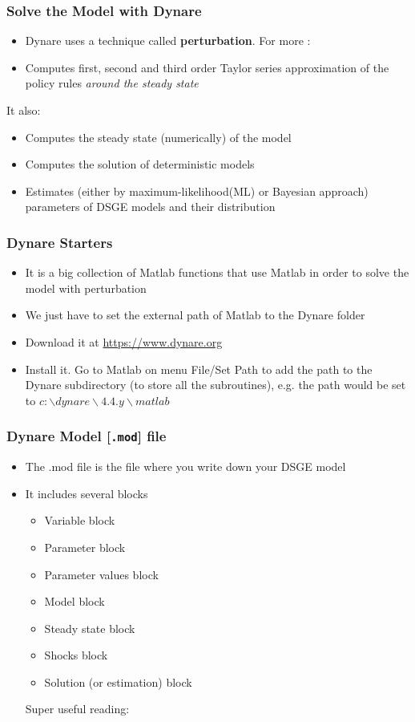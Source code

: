 \documentclass[xcolor=dvipsnames,handout,aspectratio=169]{beamer}
\let\oldcite=\cite
\renewcommand\cite[1]{\hypersetup{linkcolor=blue} \hyperlink{#1}{\oldcite{#1}}}
\begin{document}
\begin{frame}[t]\frametitle{\textbf{Solve the Model with Dynare}}
  \begin{itemize}
     \setlength\itemsep{2em}
  \item Dynare uses a technique called \textbf{perturbation}. For more : \cite{judd1998numerical}
  \item Computes first, second and third order Taylor series approximation of the policy rules \textit{around the steady state} 
  \end{itemize}
  It also: 
    \begin{itemize}
           \setlength\itemsep{2em}
  \item Computes the steady state (numerically) of the model
  \item Computes the solution of deterministic models
  \item Estimates (either by maximum-likelihood(ML) or Bayesian approach) parameters of DSGE models and their distribution
\end{itemize}
\end{frame}


\begin{frame}[t]\frametitle{\textbf{Dynare Starters}}
  \begin{itemize}
         \setlength\itemsep{2em}
  \item It is a big collection of Matlab functions that use Matlab in order to solve the model with perturbation 
  \item We just have to set the external path of Matlab to the Dynare folder
  \item Download it at \url{https://www.dynare.org}
  \item Install it. Go to Matlab on menu File/Set Path to add the path to the Dynare subdirectory (to store all the subroutines), e.g. the path would be set to $c:\backslash dynare\backslash 4.4.y\backslash matlab$
\end{itemize}
\end{frame}

\begin{frame}[t]\frametitle{\textbf{Dynare Model [\texttt{.mod}] file}}
  \begin{itemize}
         \setlength\itemsep{2em}
  \item The .mod file is the file where you write down your DSGE model 
 \item It includes several blocks
   \begin{itemize}
 \item Variable block
 \item Parameter block
\item Parameter values block
 \item Model block
 \item Steady state block
 \item Shocks block
 \item Solution (or estimation) block
 \end{itemize}
Super useful reading: \cite{Adjemianetal2011}
\end{itemize}
\end{frame}
\end{document}
